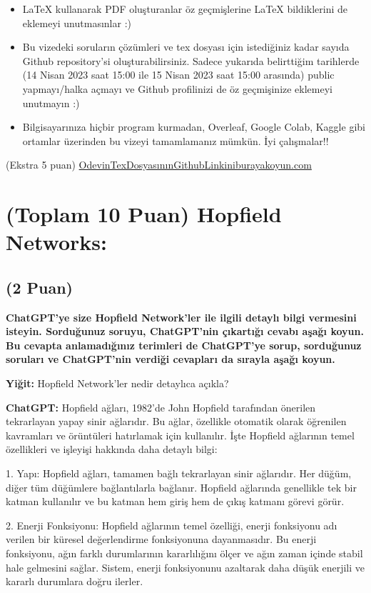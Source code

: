 \documentclass[11pt]{article}
\begin{document}
\begin{itemize}
    \item LaTeX kullanarak PDF oluşturanlar öz geçmişlerine LaTeX bildiklerini de eklemeyi unutmasınlar :)
    \item Bu vizedeki soruların çözümleri ve tex dosyası için istediğiniz kadar sayıda Github repository'si oluşturabilirsiniz. Sadece yukarıda belirttiğim tarihlerde (14 Nisan 2023 saat 15:00 ile 15 Nisan 2023 saat 15:00 arasında) public yapmayı/halka açmayı ve Github profilinizi de öz geçmişinize eklemeyi unutmayın :)
    \item Bilgisayarınıza hiçbir program kurmadan, Overleaf, Google Colab, Kaggle gibi ortamlar üzerinden bu vizeyi tamamlamanız mümkün. İyi çalışmalar!!
\end{itemize}

(Ekstra 5 puan) \url{OdevinTexDosyasınınGithubLinkiniburayakoyun.com}

\newpage
\section{(Toplam 10 Puan) Hopfield Networks:}

\subsection{(2 Puan)} \textbf{ChatGPT’ye size Hopfield Network’ler ile ilgili detaylı bilgi vermesini isteyin. Sorduğunuz soruyu, ChatGPT'nin çıkartığı cevabı aşağı koyun. Bu cevapta anlamadığınız terimleri de ChatGPT’ye sorup, sorduğunuz soruları ve ChatGPT’nin verdiği cevapları da sırayla aşağı koyun.}

\textbf{Yiğit:} Hopfield Network’ler nedir detaylıca açıkla? 

\textbf{ChatGPT:} Hopfield ağları, 1982'de John Hopfield tarafından önerilen tekrarlayan yapay sinir ağlarıdır. Bu ağlar, özellikle otomatik olarak öğrenilen kavramları ve örüntüleri hatırlamak için kullanılır. İşte Hopfield ağlarının temel özellikleri ve işleyişi hakkında daha detaylı bilgi:

1. Yapı: Hopfield ağları, tamamen bağlı tekrarlayan sinir ağlarıdır. Her düğüm, diğer tüm düğümlere bağlantılarla bağlanır. Hopfield ağlarında genellikle tek bir katman kullanılır ve bu katman hem giriş hem de çıkış katmanı görevi görür.

2. Enerji Fonksiyonu: Hopfield ağlarının temel özelliği, enerji fonksiyonu adı verilen bir küresel değerlendirme fonksiyonuna dayanmasıdır. Bu enerji fonksiyonu, ağın farklı durumlarının kararlılığını ölçer ve ağın zaman içinde stabil hale gelmesini sağlar. Sistem, enerji fonksiyonunu azaltarak daha düşük enerjili ve kararlı durumlara doğru ilerler.
\end{document}
